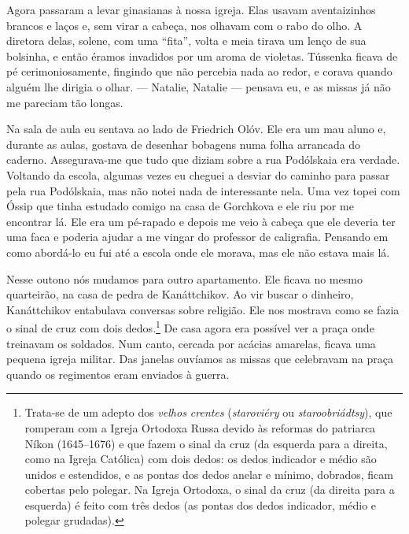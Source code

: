Agora passaram a levar ginasianas à nossa igreja. Elas usavam
aventaizinhos brancos e laços e, sem virar a cabeça, nos olhavam com o
rabo do olho. A diretora delas, solene, com uma ``fita'', volta e meia
tirava um lenço de sua bolsinha, e então éramos invadidos por um aroma
de violetas. Tússenka ficava de pé cerimoniosamente, fingindo que não
percebia nada ao redor, e corava quando alguém lhe dirigia o olhar. ---
Natalie, Natalie --- pensava eu, e as missas já não me pareciam tão
longas.

Na sala de aula eu sentava ao lado de Friedrich Olóv. Ele era um mau
aluno e, durante as aulas, gostava de desenhar bobagens numa folha
arrancada do caderno. Assegurava-me que tudo que diziam sobre a rua
Podólskaia era verdade. Voltando da escola, algumas vezes eu cheguei a
desviar do caminho para passar pela rua Podólskaia, mas não notei nada
de interessante nela. Uma vez topei com Óssip que tinha estudado comigo
na casa de Gorchkova e ele riu por me encontrar lá. Ele era um pé-rapado
e depois me veio à cabeça que ele deveria ter uma faca e poderia ajudar
a me vingar do professor de caligrafia. Pensando em como abordá-lo eu
fui até a escola onde ele morava, mas ele não estava mais lá.

Nesse outono nós mudamos para outro apartamento. Ele ficava no mesmo
quarteirão, na casa de pedra de Kanáttchikov. Ao vir buscar o dinheiro,
Kanáttchikov entabulava conversas sobre religião. Ele nos mostrava como
se fazia o sinal de cruz com dois dedos.\footnote{Trata-se de um adepto
  dos \emph{velhos crentes} (\emph{staroviéry} ou
  \emph{staroobriádtsy}), que romperam com a Igreja Ortodoxa Russa
  devido às reformas do patriarca Níkon (1645--1676) e que fazem
  o sinal da cruz (da esquerda para a direita, como na Igreja Católica)
  com dois dedos: os dedos indicador e médio são unidos e estendidos, e
  as pontas dos dedos anelar e mínimo, dobrados, ficam cobertas pelo
  polegar. Na Igreja Ortodoxa, o sinal da cruz (da direita para a
  esquerda) é feito com três dedos (as pontas dos dedos indicador, médio
  e polegar grudadas).} De casa agora era possível ver a praça onde
treinavam os soldados. Num canto, cercada por acácias amarelas, ficava
uma pequena igreja militar. Das janelas ouvíamos as missas que
celebravam na praça quando os regimentos eram enviados à guerra.

